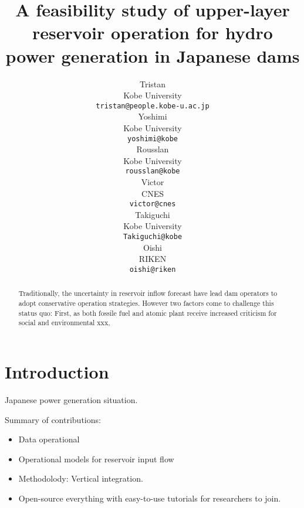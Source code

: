 \documentclass{article}
\title{
	A feasibility study of upper-layer reservoir operation for hydro power generation in Japanese dams
}
\author{ Tristan \\
	Kobe University\\
	\texttt{tristan@people.kobe-u.ac.jp} \\
	\And
	Yoshimi \\
	Kobe University\\
	\texttt{yoshimi@kobe} \\
	\And
	Rousslan \\
	Kobe University\\
	\texttt{rousslan@kobe} \\
	\And
	Victor \\
	CNES\\
	\texttt{victor@cnes} \\	
	\And
	Takiguchi \\
	Kobe University\\
	\texttt{Takiguchi@kobe} \\	
	\And
	Oishi \\
	RIKEN\\
	\texttt{oishi@riken} \\	
}
\date{}
\begin{document}
\maketitle

\begin{abstract}



Traditionally, the uncertainty in reservoir inflow forecast
have lead dam operators to adopt conservative operation strategies.
However two factors come to challenge this status quo:
First, as both fossile fuel and atomic plant receive increased criticism for
social and environmental xxx, 








\end{abstract}



\section{Introduction}
\label{sec:Introduction}

% 
Japanese power generation situation.

% 
Summary of contributions: 

\begin{itemize}
	\item Data operational
	\item Operational models for reservoir input flow
	\item Methodolody: Vertical integration.
	\item Open-source everything with easy-to-use tutorials for researchers to join.
\end{itemize}
\end{document}
